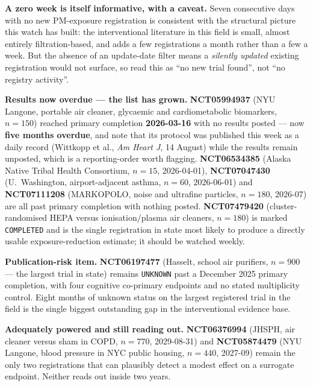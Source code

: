 \documentclass[10pt]{article}
\begin{document}
\vspace{1.5mm}
\footnotesize
\textbf{A zero week is itself informative, with a caveat.} Seven consecutive days with no
new PM-exposure registration is consistent with the structural picture this watch has
built: the interventional literature in this field is small, almost entirely
filtration-based, and adds a few registrations a month rather than a few a week. But the
absence of an update-date filter means a \emph{silently updated} existing registration
would not surface, so read this as ``no new trial found'', not ``no registry activity''.

\vspace{1.5mm}
\textbf{Results now overdue --- the list has grown.} \textbf{NCT05994937} (NYU Langone,
portable air cleaner, glycaemic and cardiometabolic biomarkers, $n=150$) reached primary
completion \textbf{2026-03-16} with no results posted --- now \textbf{five months
overdue}, and note that its protocol was published this week as a daily record
(Wittkopp et al., \textit{Am Heart J}, 14 August) while the results remain unposted, which
is a reporting-order worth flagging. \textbf{NCT06534385} (Alaska Native Tribal Health
Consortium, $n=15$, 2026-04-01), \textbf{NCT07047430} (U.\ Washington, airport-adjacent
asthma, $n=60$, 2026-06-01) and \textbf{NCT07111208} (MARKOPOLO, noise and ultrafine
particles, $n=180$, 2026-07) are all past primary completion with nothing posted.
\textbf{NCT07479420} (cluster-randomised HEPA versus ionisation/plasma air cleaners,
$n=180$) is marked \texttt{COMPLETED} and is the single registration in state most likely
to produce a directly usable exposure-reduction estimate; it should be watched weekly.

\vspace{1.5mm}
\textbf{Publication-risk item.} \textbf{NCT06197477} (Hasselt, school air purifiers,
$n=900$ --- the largest trial in state) remains \texttt{UNKNOWN} past a December 2025
primary completion, with four cognitive co-primary endpoints and no stated multiplicity
control. Eight months of unknown status on the largest registered trial in the field is
the single biggest outstanding gap in the interventional evidence base.

\vspace{1.5mm}
\textbf{Adequately powered and still reading out.} \textbf{NCT06376994} (JHSPH, air
cleaner versus sham in COPD, $n=770$, 2029-08-31) and \textbf{NCT05874479} (NYU Langone,
blood pressure in NYC public housing, $n=440$, 2027-09) remain the only two registrations
that can plausibly detect a modest effect on a surrogate endpoint. Neither reads out
inside two years.
\end{document}
